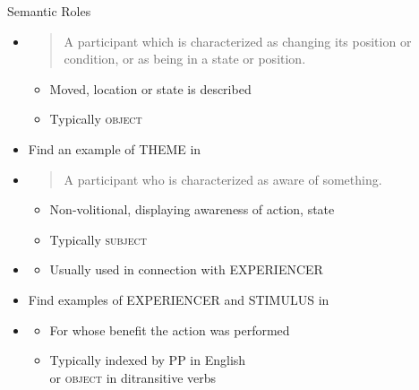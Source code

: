 \begin{frame}[allowframebreaks]{Semantic Roles}
\begin{itemize}
\framebreak
\item  {}
  \begin{quote}
     A participant which is characterized as changing its position or condition, or as
being in a state or position. 
  \end{quote}
  \begin{itemize}
  \item  Moved, location or state is described
  \item Typically \textsc{object}
\end{itemize}
\begin{exe}
  \ex {}
  \ex {}
  \ex {}
  \ex {}
  \ex *
\end{exe}
\item Find an example of THEME in \Story{}\task
\framebreak

\item  {}
  \begin{quote}
    A participant who is characterized as aware of something.
  \end{quote}
  \begin{itemize}
  \item   Non-volitional, displaying awareness of action, state
  \item Typically \textsc{subject}
  \end{itemize}
  \begin{exe}
  \ex{}
  \ex{}
  \ex{}
\end{exe}
\item  {}
  \begin{itemize}
  \item  Usually used in connection with EXPERIENCER
  \end{itemize}
  \begin{exe}
  \ex{}
  \ex{}
\end{exe}
\item Find examples of EXPERIENCER and  STIMULUS in \Story{}\task

  \framebreak
\item  {}
  \begin{itemize}
  \item   For whose benefit the action was performed
  \item   Typically indexed by  PP in English
    \\ or \textsc{object} in ditransitive verbs
  \end{itemize}
  \begin{exe}
  \ex{}
  \ex{}
\end{exe}


\end{itemize}
\end{frame}
